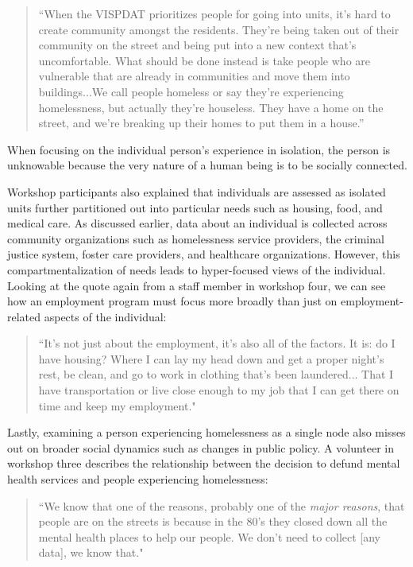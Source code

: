 \begin{quote}\singlespacing ``When the VISPDAT prioritizes people for going into units, it's hard to create community amongst the residents. They're being taken out of their community on the street and being put into a new context that's uncomfortable. What should be done instead is take people who are vulnerable that are already in communities and move them into buildings...We call people homeless or say they're experiencing homelessness, but actually they're houseless. They have a home on the street, and we're breaking up their homes to put them in a house.'' \end{quote}

When focusing on the individual person's experience in isolation, the person is unknowable because the very nature of a human being is to be socially connected.

Workshop participants also explained that individuals are assessed as isolated units further partitioned out into particular needs such as housing, food, and medical care. As discussed earlier, data about an individual is collected across community organizations such as homelessness service providers, the criminal justice system, foster care providers, and healthcare organizations. However, this compartmentalization of needs leads to hyper-focused views of the individual. Looking at the quote again from a staff member in workshop four, we can see how an employment program must focus more broadly than just on employment-related aspects of the individual:

\begin{quote}\singlespacing ``It's not just about the employment, it's also all of the factors. It is: do I have housing? Where I can lay my head down and get a proper night's rest, be clean, and go to work in clothing that's been laundered... That I have transportation or live close enough to my job that I can get there on time and keep my employment." \end{quote}

Lastly, examining a person experiencing homelessness as a single node also misses out on broader social dynamics such as changes in public policy. A volunteer in workshop three describes the relationship between the decision to defund mental health services and people experiencing homelessness:

\begin{quote}\singlespacing ``We know that one of the reasons, probably one of the \textit{major reasons}, that people are on the streets is because in the 80's they closed down all the mental health places to help our people. We don't need to collect [any data], we know that." \end{quote}


